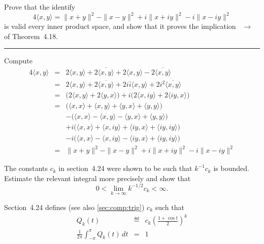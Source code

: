 \begin{enumerate}
\begin{minipage}[t]{.8\textwidth}
Prove that the identify
\begin{equation*}
4\langle x,y \rangle
=
    \|x+y\|^2
 -  \|x-y\|^2
 +  i\|x+iy\|^2
 -  i\|x-iy\|^2
\end{equation*}
is valid every inner product space, and show that it proves the
implication ~\(\to\)~ of Theorem~4.18.
\smallskip\hrule
\end{minipage}

Compute
\begin{eqnarray*}
 4\langle x,y \rangle
&=&
      2 \langle x,y \rangle
    + 2 \overline{\langle x,y \rangle}
    + 2 \langle x,y \rangle
    - 2 \overline{\langle x,y \rangle}  \\
&=&
      2 \langle x,y \rangle
    + 2 \overline{\langle x,y \rangle}
    + 2i\overline{i} \langle x,y \rangle
    + 2i^2\overline{\langle x,y \rangle}  \\
&=&
    \bigl(2 \langle x,y \rangle + 2 \langle y,x \rangle \bigr)
    + i \bigl(2 \langle x,iy \rangle + 2 \langle iy,x \rangle \bigr) \\
&=&
   \bigl(
      \langle x,x \rangle
    + \langle x,y \rangle
    + \langle y,x \rangle
    + \langle y,y \rangle \bigr)
 \\ &&
  -
   \bigl(
      \langle x,x \rangle
    - \langle x,y \rangle
    - \langle y,x \rangle
    + \langle y,y \rangle \bigr)
 \\
&&
  +
   i\bigl(
      \langle x,x \rangle
    + \langle x,iy \rangle
    + \langle iy,x \rangle
    + \langle iy,iy \rangle \bigr)
 \\ &&
  -
   i\bigl(
      \langle x,x \rangle
    - \langle x,iy \rangle
    - \langle iy,x \rangle
    + \langle iy,iy \rangle \bigr)
 \\
&=&
    \|x+y\|^2
 -  \|x-y\|^2
 +  i\|x+iy\|^2
 -  i\|x-iy\|^2
\end{eqnarray*}



\begin{excopy}
The constants \(c_k\) in section~4.24 were shown to be such that
\(k^{-1}c_k\) is bounded.
Estimate the relevant integral more precisely and show that
\begin{equation*}
 0 < \lim_{k\to\infty} k^{-1/2} c_k < \infty.
\end{equation*}
\end{excopy}

Section~4.24 defines (see also \ref{sec:comp:trig}) \(c_k\) such that
\begin{eqnarray*}
Q_k(t) &\eqdef& c_k \left(\frac{1+\cos t}{2}\right)^k \\
\frac{1}{2\pi} \int_{-\pi}^\pi Q_k(t)\,dt &=& 1
\end{eqnarray*}


\end{enumerate}
